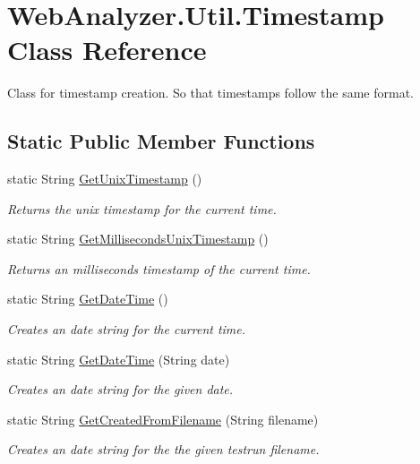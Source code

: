 \hypertarget{class_web_analyzer_1_1_util_1_1_timestamp}{}\section{Web\+Analyzer.\+Util.\+Timestamp Class Reference}
\label{class_web_analyzer_1_1_util_1_1_timestamp}


Class for timestamp creation. So that timestamps follow the same format.  


\subsection*{Static Public Member Functions}
\begin{DoxyCompactItemize}
\item 
static String \hyperlink{class_web_analyzer_1_1_util_1_1_timestamp_a444c15a3477e38b4b34850a0bd601a5d}{Get\+Unix\+Timestamp} ()
\begin{DoxyCompactList}\small\item\em Returns the unix timestamp for the current time. \end{DoxyCompactList}\item 
static String \hyperlink{class_web_analyzer_1_1_util_1_1_timestamp_ad90708976b5cebb0512e20ba0011dcdf}{Get\+Milliseconds\+Unix\+Timestamp} ()
\begin{DoxyCompactList}\small\item\em Returns an milliseconds timestamp of the current time. \end{DoxyCompactList}\item 
static String \hyperlink{class_web_analyzer_1_1_util_1_1_timestamp_a3f8fe9efc6a3f6a811d5b6af7e748ed7}{Get\+Date\+Time} ()
\begin{DoxyCompactList}\small\item\em Creates an date string for the current time. \end{DoxyCompactList}\item 
static String \hyperlink{class_web_analyzer_1_1_util_1_1_timestamp_a4040173245bf7cca4eb4d2879cdd0671}{Get\+Date\+Time} (String date)
\begin{DoxyCompactList}\small\item\em Creates an date string for the given date. \end{DoxyCompactList}\item 
static String \hyperlink{class_web_analyzer_1_1_util_1_1_timestamp_a2001b6787045c95751e9e7fb00baf044}{Get\+Created\+From\+Filename} (String filename)
\begin{DoxyCompactList}\small\item\em Creates an date string for the the given testrun filename. \end{DoxyCompactList}\end{DoxyCompactItemize}



